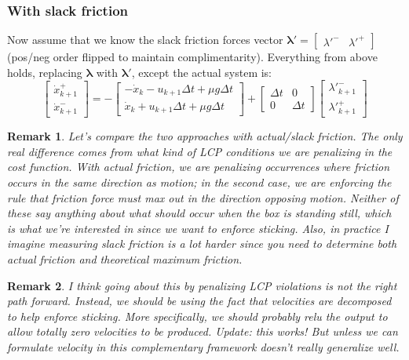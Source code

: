 \documentclass{article}
\newtheorem{remark}{Remark}
\renewcommand{\vec}[1]{\boldsymbol{#1}}
\newcommand{\rvec}[1]{\begin{bmatrix} #1 \end{bmatrix}}
\begin{document}
\subsubsection{With slack friction}
Now assume that we know the slack friction forces vector $\vec{\lambda'} = \rvec{\lambda'^- & \lambda'^+}$ (pos/neg order flipped to maintain complimentarity). Everything from above holds, replacing $\vec{\lambda}$ with $\vec{\lambda'}$, except the actual system is:
\[
    \begin{bmatrix}
        \dot x ^+_{k+1} \\
        \dot x ^-_{k+1}
    \end{bmatrix}
    =
    -
    \begin{bmatrix}
        - \dot x_k - u_{k+1} \Delta t + \mu g \Delta t \\
        \dot x_k + u_{k+1} \Delta t + \mu g \Delta t  
    \end{bmatrix}
    +
    \begin{bmatrix}
        \Delta t & 0 \\
        0 & \Delta t
    \end{bmatrix}
    \begin{bmatrix}
        \lambda '^-_{k+1} \\
        \lambda '^+_{k+1}
    \end{bmatrix}
\]

\begin{remark}
    Let's compare the two approaches with actual/slack friction. The only real difference comes from what kind of LCP conditions we are penalizing in the cost function. With actual friction, we are penalizing occurrences where friction occurs in the same direction as motion; in the second case, we are enforcing the rule that friction force must max out in the direction opposing motion. Neither of these say anything about what should occur when the box is standing still, which is what we're interested in since we want to enforce sticking. Also, in practice I imagine measuring slack friction is a lot harder since you need to determine both actual friction and theoretical maximum friction.
\end{remark}

\begin{remark}
    I think going about this by penalizing LCP violations is not the right path forward. Instead, we should be using the fact that velocities are decomposed to help enforce sticking. More specifically, we should probably relu the output to allow totally zero velocities to be produced. Update: this works! But unless we can formulate velocity in this complementary framework doesn't really generalize well.
\end{remark}
\end{document}
